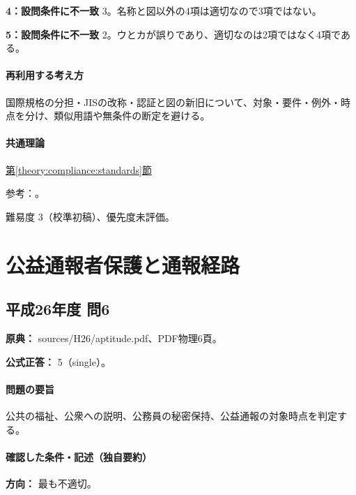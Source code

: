 \noindent\textbf{4：設問条件に不一致} 3。名称と図以外の4項は適切なので3項ではない。\par

\noindent\textbf{5：設問条件に不一致} 2。ウとカが誤りであり、適切なのは2項ではなく4項である。\par

\paragraph{再利用する考え方} 国際規格の分担・JISの改称・認証と図の新旧について、対象・要件・例外・時点を分け、類似用語や無条件の断定を避ける。

\paragraph{共通理論} \hyperref[theory:compliance:standards]{第\ref*{theory:compliance:standards}節}

\par 参考：\cite{jisc_isoiec,jisc_certification,jisc_marks,meti_jis2019,mhlw_jis_history}。

\par 難易度 3（校準初稿）、優先度未評価。

\section{公益通報者保護と通報経路}

\subsection{平成26年度 問6}
\label{q:h26-reg-apt-06}

\noindent\textbf{原典：} sources/H26/aptitude.pdf、PDF物理6頁。

\textbf{公式正答：} 5（single）。

\paragraph{問題の要旨} 公共の福祉、公衆への説明、公務員の秘密保持、公益通報の対象時点を判定する。

\paragraph{確認した条件・記述（独自要約）}\mbox{}\par

\noindent\textbf{方向：} 最も不適切。\par


